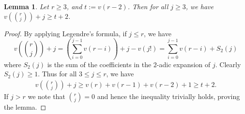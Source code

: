 \documentclass[11pt, reqno]{amsart}
\numberwithin{equation}{section}
\newtheorem{lemma}[thm]{Lemma}
\theoremstyle{definition}
\theoremstyle{remark}
\theoremstyle{definition}
\theoremstyle{remark}
\theoremstyle{remark}
\begin{document}
\begin{lemma}\label{sl1cmb1}
Let $r\geq 3$, and $t:= v(r-2)$. Then for all $j\geq 3$, we have $v\left({r \choose j}\right)+j \geq t+2$. %
\end{lemma}
\begin{proof}
By applying Legendre's formula, if $ j\leq r$, we have
\begin{equation}\label{sl1cmb1eq1}
        v\left({r \choose j}\right)+ j = \left(\sum_{i=0}^{j-1}v(r-i)\right)+j-v(j!)
        = \sum_{i=0}^{j-1}v(r-i)+S_{2}(j)
\end{equation}
where $S_{2}(j)$ is the sum of the coefficients in the $2$-adic expansion of $j$. 
Clearly $S_{2}(j)\geq1$. Thus  for all $3\leq j\leq r$, we have
\begin{eqnarray*}
v\left({r \choose j}\right)+j\geq v(r)+v(r-1)+v(r-2)+1\geq t+2.
\end{eqnarray*}
If $j>r$ we note that ${r\choose j}=0$ and hence the inequality trivially holds,  proving the lemma.
\end{proof}

\end{document}
